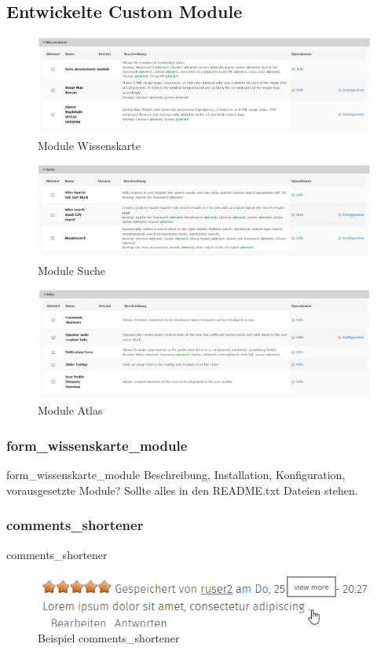 \subsection{Entwickelte Custom Module}\label{sub:custom_modules}
\begin{figure}[!h]
	\centering
	\includegraphics[width=0.8\linewidth]{images/modules_knowledgemap}
	\caption[]{Module Wissenskarte}
	\label{fig:modules_knowledgemap}
\end{figure}
\begin{figure}[!h]
	\centering
	\includegraphics[width=0.8\linewidth]{images/modules_search}
	\caption[]{Module Suche}
	\label{fig:modules_search}
\end{figure}
\begin{figure}[!h]
	\centering
	\includegraphics[width=0.8\linewidth]{images/modules_atlas}
	\caption[]{Module Atlas}
	\label{fig:modules_atlas}
\end{figure}




\subsubsection{form\_wissenskarte\_module}\label{subsub:km}
form\_wissenskarte\_module
Beschreibung, Installation, Konfiguration, vorausgesetzte Module? Sollte alles in den README.txt Dateien stehen.

\subsubsection{comments\_shortener}\label{subsub:commentsshortener}
comments\_shortener
\begin{figure}[H]
	\centering
	\includegraphics[width=0.50\linewidth]{images/example_commentsshortener}
	\caption[]{Beispiel comments\_shortener}
	\label{fig:example_commentshortener}
\end{figure}



